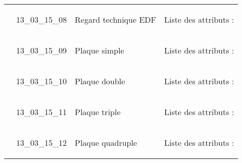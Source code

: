 \documentclass[12pt,titlepage,oneside]{book}
\begin{document}
\begin{supertabular}{|p{10cm}|c|p{13cm}|p{12cm}|}
                    & 13\_03\_15\_08 & Regard technique EDF & Liste des attributs :
\begin{enumerate}
\end{enumerate}
\\


                    & 13\_03\_15\_09 & Plaque simple & Liste des attributs :
\begin{enumerate}
\end{enumerate}
\\


                    & 13\_03\_15\_10 & Plaque double & Liste des attributs :
\begin{enumerate}
\end{enumerate}
\\


                    & 13\_03\_15\_11 & Plaque triple & Liste des attributs :
\begin{enumerate}
\end{enumerate}
\\


                    & 13\_03\_15\_12 & Plaque quadruple & Liste des attributs :
\begin{enumerate}
\end{enumerate}
\\
\hline
\end{supertabular}
\end{document}
